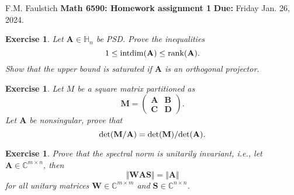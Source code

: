 \documentclass[11pt]{article}
\newcommand{\bvec}[1]{\mathbf{#1}}
\newcommand{\vA}{\bvec{A}}
\newcommand{\vB}{\bvec{B}}
\newcommand{\vC}{\bvec{C}}
\newcommand{\vD}{\bvec{D}}
\newcommand{\vM}{\bvec{M}}
\newcommand{\vS}{\bvec{S}}
\newcommand{\vW}{\bvec{W}}
\newtheorem{exercise}[theorem]{Exercise}
\begin{document}
\begin{flushleft}
F.M. Faulstich \hfill {\large\bf Math 6590: Homework assignment 1} \hfill {\bf Due:} Friday Jan. 26, 2024.\\
\end{flushleft}

\begin{exercise}
Let $\vA\in\mathbb{H}_n$ be PSD. Prove the inequalities
\begin{equation}
1 \leq {\rm intdim}(\vA) \leq {\rm rank} (\vA).
\end{equation}
Show that the upper bound is saturated if $\vA$ is an orthogonal projector.
\end{exercise}

\begin{exercise}
Let $M$ be a square matrix partitioned as 
\begin{equation}
\vM = 
\begin{pmatrix}
\vA & \vB \\
\vC & \vD
\end{pmatrix}.
\end{equation}
Let $\vA$ be nonsingular, prove that
\begin{equation}
{\rm det}(\vM/\vA) = {\rm det}(\vM)/ {\rm det} (\vA).
\end{equation}
\end{exercise}

\begin{exercise}
Prove that the spectral norm is unitarily invariant, i.e., let $\vA\in\mathbb{C}^{m \times n}$, then
$$
\Vert \vW \vA \vS\Vert
=
\Vert  \vA \Vert
$$
for all unitary matrices $\vW \in\mathbb{C}^{m \times m}$ and $\vS\in\mathbb{C}^{n\times n}$.
\end{exercise}
\end{document}

